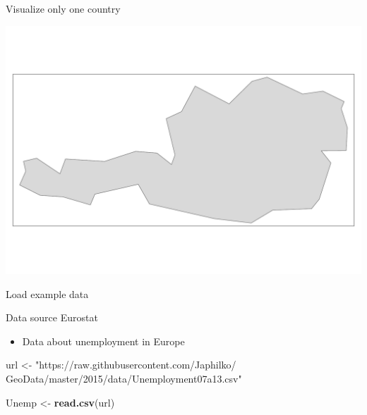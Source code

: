 \documentclass[
  ignorenonframetext,
]{beamer}
\newenvironment{Shaded}{\begin{snugshade}}{\end{snugshade}}
\newcommand{\KeywordTok}[1]{\textcolor[rgb]{0.13,0.29,0.53}{\textbf{#1}}}
\newcommand{\NormalTok}[1]{#1}
\newcommand{\OperatorTok}[1]{\textcolor[rgb]{0.81,0.36,0.00}{\textbf{#1}}}
\newcommand{\StringTok}[1]{\textcolor[rgb]{0.31,0.60,0.02}{#1}}
\providecommand{\tightlist}{%
  \setlength{\itemsep}{0pt}\setlength{\parskip}{0pt}}
\begin{document}
\begin{frame}[fragile]{Visualize only one country}
\protect\hypertarget{visualize-only-one-country}{}
\begin{Shaded}
\end{Shaded}

\includegraphics{quick_high_quality_maps_files/figure-beamer/unnamed-chunk-21-1.pdf}
\end{frame}

\begin{frame}[fragile]{Load example data}
\protect\hypertarget{load-example-data}{}
\begin{block}{Data source Eurostat}
\protect\hypertarget{data-source-eurostat}{}
\begin{itemize}
\tightlist
\item
  Data about unemployment in Europe
\end{itemize}

\begin{Shaded}
\begin{Highlighting}[]
\NormalTok{url \textless{}{-}}\StringTok{ "https://raw.githubusercontent.com/Japhilko/}
\StringTok{GeoData/master/2015/data/Unemployment07a13.csv"}

\NormalTok{Unemp \textless{}{-}}\StringTok{ }\KeywordTok{read.csv}\NormalTok{(url) }
\end{Highlighting}
\end{Shaded}
\end{block}
\end{frame}
\end{document}
